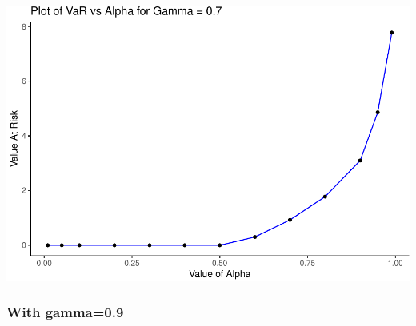 \documentclass[]{article}
\begin{document}
\includegraphics{Integrated_Management_Formulation_Model_files/figure-latex/unnamed-chunk-19-1.pdf}

\subsubsection{With gamma=0.9}\label{with-gamma0.9}
\end{document}
